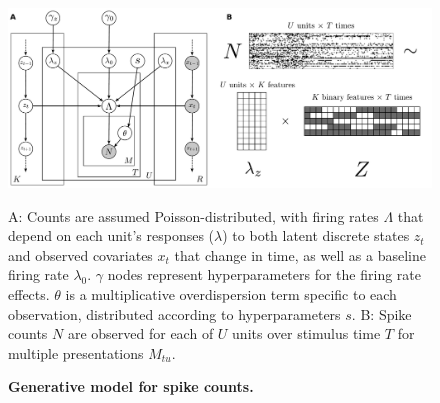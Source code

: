 \documentclass[10pt,letterpaper]{article}
\begin{document}
\begin{figure}[!h]
    \includegraphics[width=\linewidth]{figures/model}
	\caption{\bf Generative model for spike counts.}
	A: Counts are assumed Poisson-distributed, with firing rates $\Lambda$ that depend on each unit's responses ($\lambda$) to both latent discrete states $z_t$ and observed covariates $x_t$ that change in time, as well as a baseline firing rate $\lambda_0$. $\gamma$ nodes represent hyperparameters for the firing rate effects. $\theta$ is a multiplicative overdispersion term specific to each observation, distributed according to hyperparameters $s$. B: Spike counts $N$ are observed for each of $U$ units over stimulus time $T$ for multiple presentations $M_{tu}$.
\label{fig1}
\end{figure}
\end{document}
